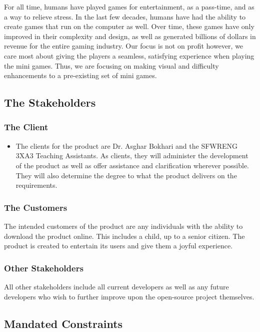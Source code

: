 \documentclass[12pt, titlepage]{article}
\begin{document}
For all time, humans have played games for entertainment, as a pass-time, and as a way to relieve stress. In the last few decades, humans have had the ability to create games that run on the computer as well. Over time, these games have only improved in their complexity and design, as well as generated billions of dollars in revenue for the entire gaming industry. Our focus is not on profit however, we care most about giving the players a seamless, satisfying experience when playing the mini games. Thus, we are focusing on making visual and difficulty enhancements to a pre-existing set of mini games.

\subsection{The Stakeholders}

\subsubsection{The Client}

\begin{itemize}
    \item The clients for the product are Dr. Asghar Bokhari and the SFWRENG 3XA3 Teaching Assistants. As clients, they will administer the development of the product as well as offer assistance and clarification wherever possible. They will also determine the degree to what the product delivers on the requirements.
\end{itemize}

\subsubsection{The Customers}

The intended customers of the product are any individuals with the ability to download the product online. This includes a child, up to a senior citizen. The product is created to entertain its users and give them a joyful experience.

\subsubsection{Other Stakeholders}

All other stakeholders include all current developers as well as any future developers who wish to further improve upon the open-source project themselves.

\subsection{Mandated Constraints}
\end{document}
